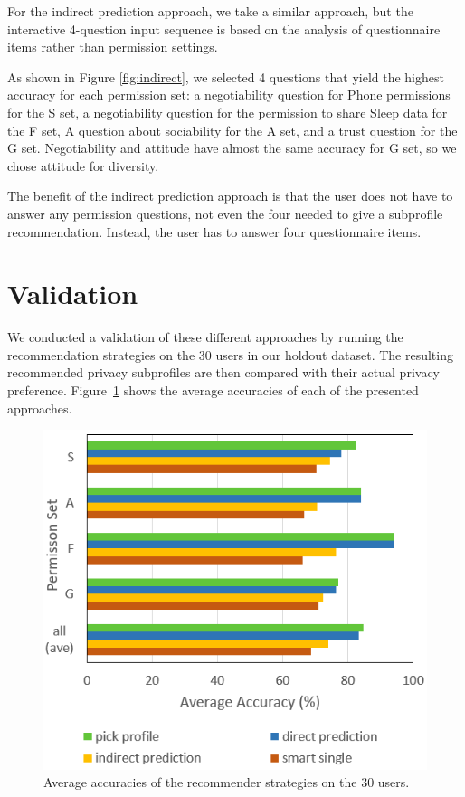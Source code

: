 For the indirect prediction approach, we take a similar approach, but the interactive 4-question input sequence is based on the analysis of questionnaire items rather than permission settings. 

As shown in Figure \ref{fig:indirect}, we selected 4 questions that yield the highest accuracy for each permission set: a negotiability question for Phone permissions for the S set, a negotiability question for the permission to share Sleep data for the F set, A question about sociability for the A set, and a trust question for the G set. %
Negotiability and attitude have almost the same accuracy for G set, so we chose attitude for diversity.

The benefit of the indirect prediction approach is that the user does not have to answer any permission questions, not even the four needed to give a subprofile recommendation. Instead, the user has to answer four questionnaire items. 



\section{Validation}
We conducted a validation of these different approaches by running the recommendation strategies on the 30 users in our holdout dataset. The resulting recommended privacy subprofiles are then compared with their actual privacy preference. Figure~\ref{fig:aveaccuracy} shows the average accuracies of each of the presented approaches.

\begin{figure}[ht]
	\includegraphics[width=1\linewidth]{figures/aveaccuracy4.png}
	\caption{Average accuracies of the recommender strategies on the 30 users.}
	\label{fig:aveaccuracy}      
\end{figure}

